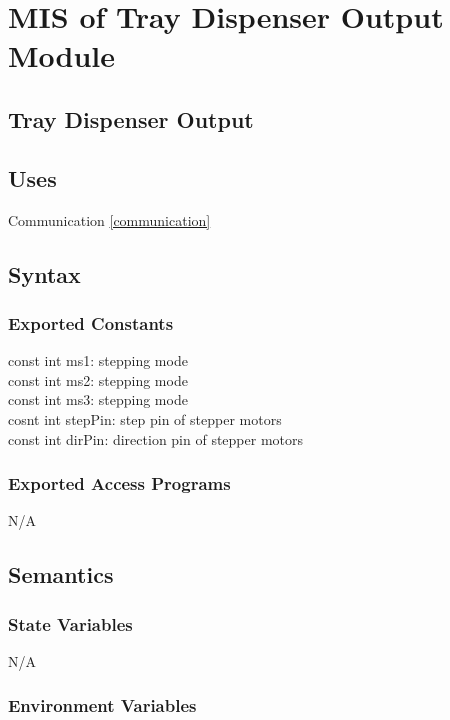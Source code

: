 \documentclass[12pt, titlepage]{article}
\begin{document}
\section{MIS of Tray Dispenser Output Module} \label{trayDispenserOutput} 

\subsection{Tray Dispenser Output}

\subsection{Uses}
Communication \ref{communication}

\subsection{Syntax}

\subsubsection{Exported Constants}
const int ms1: stepping mode\\
const int ms2: stepping mode\\
const int ms3: stepping mode\\
cosnt int stepPin: step pin of stepper motors\\
const int dirPin: direction pin of stepper motors\\
\subsubsection{Exported Access Programs}

N/A

\subsection{Semantics}

\subsubsection{State Variables}

N/A

\subsubsection{Environment Variables}
\end{document}
